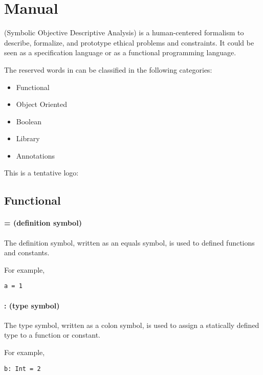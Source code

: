 \chapter{Manual}

\Soda (Symbolic Objective Descriptive Analysis) is a human-centered formalism to describe, formalize, and prototype ethical problems and constraints.
It could be seen as a specification language or as a functional programming language.

The reserved words in \Soda can be classified in the following categories:

\begin{itemize}
    \item Functional
    \item Object Oriented
    \item Boolean
    \item Library
    \item Annotations
\end{itemize}



This is a tentative logo:

\Sodalogo

\section{Functional}

\subsubsection{= (definition symbol)}

The definition symbol, written as an equals symbol, is used to defined functions and constants.

For example,
\begin{lstlisting}[label={lst:exampleDef}]
  a = 1
\end{lstlisting}

\subsubsection{: (type symbol)}

The type symbol, written as a colon symbol, is used to assign a statically defined type to a function or constant.

For example,
\begin{lstlisting}[label={lst:exampleType01}]
  b: Int = 2
\end{lstlisting}

